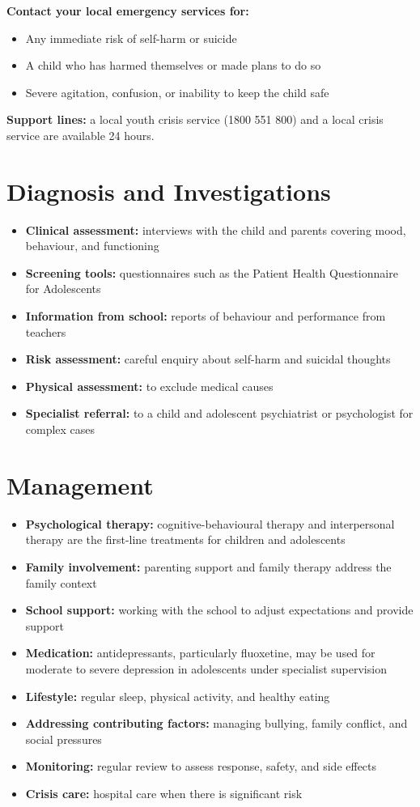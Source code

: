 \textbf{Contact your local emergency services for:}
\begin{itemize}
    \item Any immediate risk of self-harm or suicide
    \item A child who has harmed themselves or made plans to do so
    \item Severe agitation, confusion, or inability to keep the child safe
\end{itemize}
\textbf{Support lines:} a local youth crisis service (1800 551 800) and a local crisis service are available 24 hours.

\section*{Diagnosis and Investigations}
\begin{itemize}
    \item \textbf{Clinical assessment:} interviews with the child and parents covering mood, behaviour, and functioning
    \item \textbf{Screening tools:} questionnaires such as the Patient Health Questionnaire for Adolescents
    \item \textbf{Information from school:} reports of behaviour and performance from teachers
    \item \textbf{Risk assessment:} careful enquiry about self-harm and suicidal thoughts
    \item \textbf{Physical assessment:} to exclude medical causes
    \item \textbf{Specialist referral:} to a child and adolescent psychiatrist or psychologist for complex cases
\end{itemize}

\section*{Management}
\begin{itemize}
    \item \textbf{Psychological therapy:} cognitive-behavioural therapy and interpersonal therapy are the first-line treatments for children and adolescents
    \item \textbf{Family involvement:} parenting support and family therapy address the family context
    \item \textbf{School support:} working with the school to adjust expectations and provide support
    \item \textbf{Medication:} antidepressants, particularly fluoxetine, may be used for moderate to severe depression in adolescents under specialist supervision
    \item \textbf{Lifestyle:} regular sleep, physical activity, and healthy eating
    \item \textbf{Addressing contributing factors:} managing bullying, family conflict, and social pressures
    \item \textbf{Monitoring:} regular review to assess response, safety, and side effects
    \item \textbf{Crisis care:} hospital care when there is significant risk
\end{itemize}


